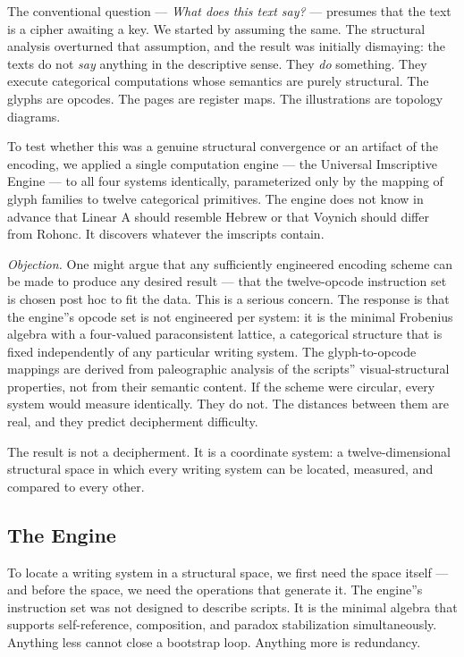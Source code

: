 \documentclass[12pt,a4paper]{article}
\begin{document}
The conventional question --- \emph{What does this text say?} --- presumes that the text is a cipher awaiting a key. We started by assuming the same. The structural analysis overturned that assumption, and the result was initially dismaying: the texts do not \emph{say} anything in the descriptive sense. They \emph{do} something. They execute categorical computations whose semantics are purely structural. The glyphs are opcodes. The pages are register maps. The illustrations are topology diagrams.

To test whether this was a genuine structural convergence or an artifact of the encoding, we applied a single computation engine --- the Universal Imscriptive Engine --- to all four systems identically, parameterized only by the mapping of glyph families to twelve categorical primitives. The engine does not know in advance that Linear A should resemble Hebrew or that Voynich should differ from Rohonc. It discovers whatever the imscripts contain.

\emph{Objection.} One might argue that any sufficiently engineered encoding scheme can be made to produce any desired result --- that the twelve-opcode instruction set is chosen post hoc to fit the data. This is a serious concern. The response is that the engine''s opcode set is not engineered per system: it is the minimal Frobenius algebra with a four-valued paraconsistent lattice, a categorical structure that is fixed independently of any particular writing system. The glyph-to-opcode mappings are derived from paleographic analysis of the scripts'' visual-structural properties, not from their semantic content. If the scheme were circular, every system would measure identically. They do not. The distances between them are real, and they predict decipherment difficulty.

The result is not a decipherment. It is a coordinate system: a twelve-dimensional structural space in which every writing system can be located, measured, and compared to every other.

\subsection{The Engine}

To locate a writing system in a structural space, we first need the space itself --- and before the space, we need the operations that generate it. The engine''s instruction set was not designed to describe scripts. It is the minimal algebra that supports self-reference, composition, and paradox stabilization simultaneously. Anything less cannot close a bootstrap loop. Anything more is redundancy.
\end{document}
